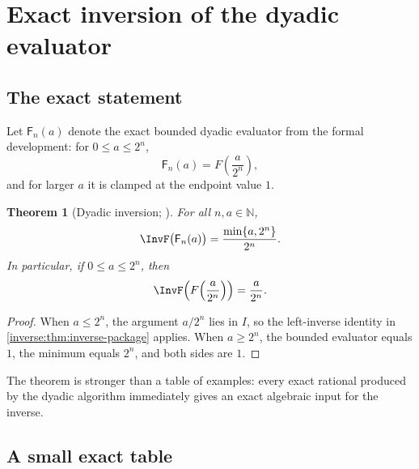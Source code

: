 \documentclass[11pt,oneside]{article}
\newtheorem{theorem}{Theorem}[section]
\theoremstyle{definition}
\theoremstyle{remark}
\newcommand{\N}{\mathbb N}
\begin{document}
\section{Exact inversion of the dyadic evaluator}
\label{inverse:sec:dyadic-inverse}

\subsection{The exact statement}

Let $\mathsf F_n(a)$ denote the exact bounded dyadic evaluator from the
formal development: for $0\leq a\leq2^n$,
\[
 \mathsf F_n(a)=F\!\left(\frac{a}{2^n}\right),
\]
and for larger $a$ it is clamped at the endpoint value $1$.

\begin{theorem}[Dyadic inversion; \Formalized]
\label{inverse:thm:dyadic-inversion}
For all $n,a\in\N$,
\[
 \InvF\bigl(\mathsf F_n(a)\bigr)
 =\frac{\min\{a,2^n\}}{2^n}.
\]
In particular, if $0\leq a\leq2^n$, then
\[
 \InvF\!\left(F\!\left(\frac a{2^n}\right)\right)=\frac a{2^n}.
\]
\end{theorem}

\begin{proof}
When $a\leq2^n$, the argument $a/2^n$ lies in $I$, so the left-inverse
identity in \cref{inverse:thm:inverse-package} applies.  When $a\geq2^n$, the
bounded evaluator equals $1$, the minimum equals $2^n$, and both sides are
$1$.
\end{proof}

The theorem is stronger than a table of examples: every exact rational
produced by the dyadic algorithm immediately gives an exact algebraic
input for the inverse.

\subsection{A small exact table}
\end{document}
